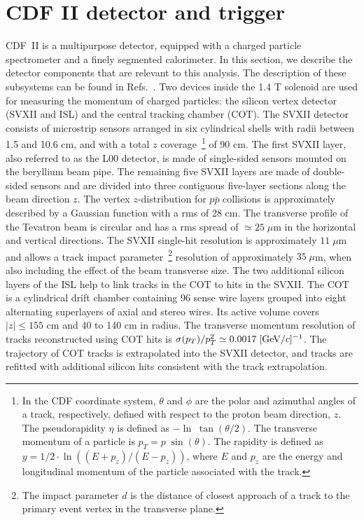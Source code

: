 \documentclass[aps,prd,preprint,floatfix,nofootinbib,superscriptaddress,showpacs,amssymb]{revtex4}
\begin{document}
 \section{CDF II detector and trigger} \label{sec:ss-det}
 CDF~II is a multipurpose detector, equipped with a charged particle
 spectrometer and a finely segmented calorimeter. In this section, we 
 describe the detector components that are relevant to this analysis.
 The description of these subsystems can be found in
 Refs.~\cite{det1,det2,det3_0,det3,det4_0,det4,det5,det6,det7,det8}.
 Two devices inside the 1.4 T solenoid are used for measuring the momentum
 of charged particles: the silicon vertex detector (SVXII and ISL) and the
 central tracking chamber (COT). The SVXII detector consists of 
 microstrip sensors arranged in six cylindrical shells with radii between
 1.5 and 10.6 cm, and with a total $z$ coverage~\footnote{
 In the CDF coordinate system, $\theta$ and $\phi$ are the polar and
 azimuthal angles of a track, respectively, defined with respect to the
 proton beam direction, $z$. The pseudorapidity $\eta$ is defined as 
 $-\ln \;\tan (\theta/2)$. The transverse momentum of a particle is 
 $p_T= p \; \sin (\theta)$. The rapidity is defined as 
 $y=1/2 \cdot \ln ( (E+p_z)/(E-p_z) )$, where $E$ and $p_z$ are the 
 energy and longitudinal momentum of the particle associated with the track.} 
 of 90 cm. The first SVXII layer, also referred to as the L00 detector,
 is made of single-sided sensors mounted on the beryllium beam pipe.
 The remaining five SVXII layers are made of double-sided sensors and 
 are divided into three contiguous five-layer sections along the beam 
 direction $z$. The vertex $z$-distribution for $p\bar{p}$ collisions is
 approximately described by a Gaussian function with a rms of 28 cm.
 The transverse profile of the Tevatron beam is circular and has a rms
 spread of $\simeq 25\; \mu$m in the horizontal and vertical directions.
 The SVXII single-hit resolution is approximately $11\; \mu$m and allows
 a track impact parameter~\footnote{
 The impact parameter $d$ is the distance of closest approach of a track
 to the primary event vertex in the transverse plane.}
 resolution of approximately $35\; \mu$m, when
 also including the effect of the beam transverse size. The two additional 
 silicon layers of the ISL help to link tracks in the COT to hits in the
 SVXII. The COT is a cylindrical drift chamber containing 96 sense wire
 layers grouped into eight alternating superlayers of axial and stereo
 wires. Its active volume covers $|z| \leq 155$ cm and 40 to 140 cm in
 radius. The transverse momentum resolution of tracks reconstructed using
 COT hits is $\sigma(p_T)/p_T^2 \simeq 0.0017\; [{\rm GeV/}c]^{-1}$. The trajectory
 of COT tracks is extrapolated into the SVXII detector, and tracks are
 refitted with additional silicon hits consistent with the track extrapolation.
\end{document}
